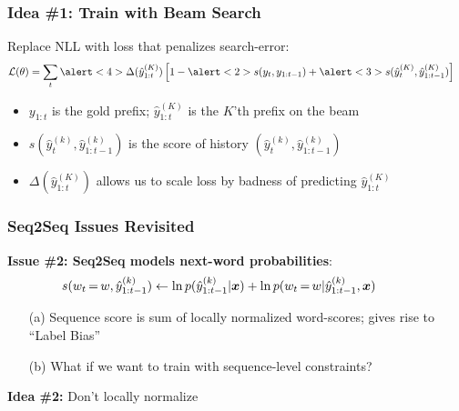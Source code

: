 \documentclass{beamer}
\newcommand{\air}{\vspace{0.25cm}}
\newcommand{\boldx}{\boldsymbol{x}}
\newcommand{\niceq}{\ensuremath{\,{=}\,}}
\let\realcitep\citep
\renewcommand*{\citep}[1]{{\footnotesize \realcitep{#1}}}
\begin{document}
\begin{frame}
\frametitle{Idea \#1: Train with Beam Search}
Replace NLL with loss that penalizes search-error: 
\begin{align*}
 \mathcal{L}&(\theta) = \sum_{t} \alert<4>{\Delta(\hat{y}_{1:t}^{(K)})} \left[1  - \alert<2>{s(y_t, y_{1:t-1})} +  \alert<3>{s(\hat{y}_t^{(K)}, \hat{y}_{1:t-1}^{(K)})} \right] 
\end{align*}

\begin{itemize}
\item $y_{1:t}$ is the gold prefix; $\hat{y}_{1:t}^{(K)}$ is the $K$'th prefix on the beam
\air
\air
\item $s(\hat{y}_t^{(k)}, \hat{y}_{1:t-1}^{(k)})$ is the score of history $(\hat{y}_t^{(k)}, \hat{y}_{1:t-1}^{(k)})$ 
\air 
\air
\item $\Delta(\hat{y}_{1:t}^{(K)})$ allows us to scale loss by badness of predicting $\hat{y}_{1:t}^{(K)}$
 
\end{itemize}
\end{frame}


\begin{frame}
\frametitle{Seq2Seq Issues Revisited}

\textbf{Issue \#2: Seq2Seq models next-word probabilities}:
\air
\begin{align*}
\hspace*{-1cm} s(w_t \niceq w, \hat{y}_{1:t-1}^{(k)}) \gets \ln p(\hat{y}^{(k)}_{1:t-1}| \boldx) + \ln p(w_{t} \niceq w | \hat{y}^{(k)}_{1:t-1}, \boldx) 
\end{align*}

\begin{enumerate}
\pause
\item[(a)] Sequence score is sum of locally normalized word-scores; gives rise to ``Label Bias''~\citep{lafferty01conditional}
\air
\pause
\item[(b)] What if we want to train with sequence-level constraints?
\end{enumerate}

\air
\air
\air
\pause
\textbf{Idea \#2:} Don't locally normalize
\end{frame}
\end{document}
